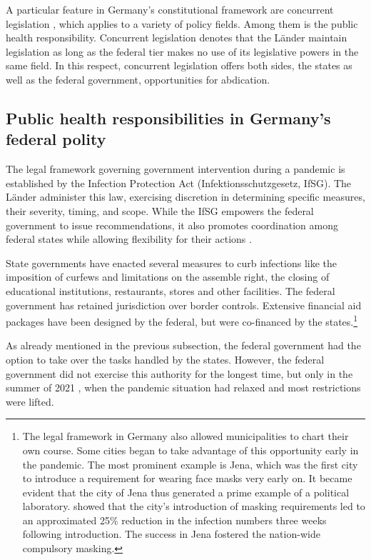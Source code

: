 \documentclass[12pt, abstract=true]{scrartcl}
\begin{document}
A particular feature in Germany's constitutional framework are concurrent legislation \citep{Gunlicks2007}, which applies to a variety of policy fields. Among them is the public health responsibility. Concurrent legislation denotes that the Länder maintain legislation as long as the federal tier makes no use of its legislative powers in the same field. In this respect, concurrent legislation offers both sides, the states as well as the federal government, opportunities for abdication.

\subsection{Public health responsibilities in Germany's federal polity}
The legal framework governing government intervention during a pandemic is established by the Infection Protection Act (Infektionsschutzgesetz, IfSG). The Länder administer this law, exercising discretion in determining specific measures, their severity, timing, and scope. While the IfSG empowers the federal government to issue recommendations, it also promotes coordination among federal states while allowing flexibility for their actions \citep{Tonti2022}.  

State governments have enacted several measures to curb infections like the imposition of curfews and limitations on the assemble right, the closing of educational institutions, restaurants, stores and other facilities. The federal government has retained jurisdiction over border controls. Extensive financial aid packages have been designed by the federal, but were co-financed by the states.\footnote{ 
	The legal framework in Germany also allowed municipalities to chart their own course. Some cities began to take advantage of this opportunity early in the pandemic. The most prominent example is Jena, which was the first city to introduce a requirement for wearing face masks very early on. It became evident that the city of Jena thus generated a prime example of a political laboratory. \cite{Mitze2020} showed that the city’s introduction of masking requirements led to an approximated 25\% reduction in the infection numbers three weeks following introduction. The success in Jena fostered the nation-wide compulsory masking.
} 

As already mentioned in the previous subsection, the federal government had the option to take over the tasks handled by the states. However, the federal government did not exercise this authority for the longest time, but only in the summer of 2021 \citep{Rowe2023}, when the pandemic situation had relaxed and most restrictions were lifted.
\end{document}
